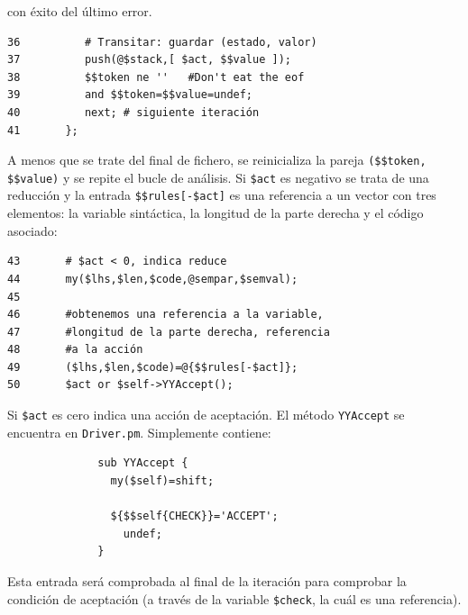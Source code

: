 con éxito del último error.
\begin{verbatim}
36          # Transitar: guardar (estado, valor)
37          push(@$stack,[ $act, $$value ]);
38          $$token ne ''   #Don't eat the eof
39          and $$token=$$value=undef;
40          next; # siguiente iteración
41       };
\end{verbatim}
A menos que se trate del final de fichero, se reinicializa
la pareja \verb|($$token, $$value)| y se repite el bucle
de análisis.
Si \verb|$act| es negativo se trata de una reducción
y la entrada \verb|$$rules[-$act]| es una referencia
a un vector con tres elementos: la variable sintáctica,
la longitud de la parte derecha y el código asociado:
\begin{verbatim}
43       # $act < 0, indica reduce
44       my($lhs,$len,$code,@sempar,$semval);
45 
46       #obtenemos una referencia a la variable,
47       #longitud de la parte derecha, referencia
48       #a la acción
49       ($lhs,$len,$code)=@{$$rules[-$act]};
50       $act or $self->YYAccept();
\end{verbatim}
Si \verb|$act| es cero indica una acción de aceptación.
El método \verb|YYAccept| se encuentra en \verb|Driver.pm|.
Simplemente contiene:

\begin{verbatim}
              sub YYAccept {
                my($self)=shift;

                ${$$self{CHECK}}='ACCEPT';
                  undef;
              }
\end{verbatim}

Esta entrada será comprobada al final de la iteración para comprobar
la condición de aceptación (a través de la 
variable \verb|$check|, la cuál es una referencia).

